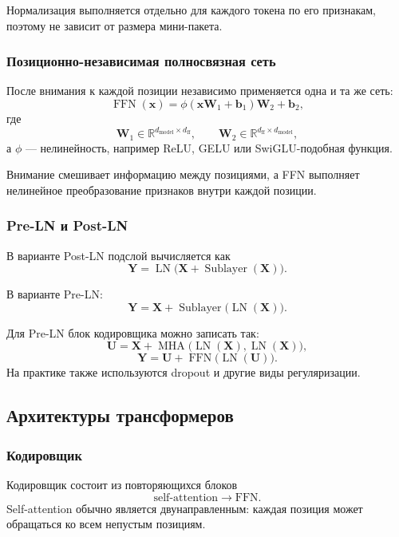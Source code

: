 \documentclass[12pt,a4paper]{article}
\theoremstyle{definition}
\newcommand{\R}{\mathbb{R}}
\newcommand{\1}{\mathbf{1}}
\begin{document}
Нормализация выполняется отдельно для каждого токена по его признакам,
поэтому не зависит от размера мини-пакета.

\subsubsection{Позиционно-независимая полносвязная сеть}

После внимания к каждой позиции независимо применяется одна и та же
сеть:
\[
    \operatorname{FFN}(\bm{x})
    =
    \phi(\bm{x}\bm{W}_1+\bm{b}_1)\bm{W}_2+\bm{b}_2,
\]
где
\[
    \bm{W}_1\in\R^{d_{\text{model}}\times d_{\text{ff}}},
    \qquad
    \bm{W}_2\in\R^{d_{\text{ff}}\times d_{\text{model}}},
\]
а $\phi$ --- нелинейность, например ReLU, GELU или SwiGLU-подобная
функция.

Внимание смешивает информацию между позициями, а FFN выполняет
нелинейное преобразование признаков внутри каждой позиции.

\subsubsection{Pre-LN и Post-LN}

В варианте Post-LN подслой вычисляется как
\[
    \bm{Y}
    =
    \operatorname{LN}
    \bigl(
        \bm{X}+\operatorname{Sublayer}(\bm{X})
    \bigr).
\]

В варианте Pre-LN:
\[
    \bm{Y}
    =
    \bm{X}
    +
    \operatorname{Sublayer}
    \bigl(
        \operatorname{LN}(\bm{X})
    \bigr).
\]

Для Pre-LN блок кодировщика можно записать так:
\[
    \bm{U}
    =
    \bm{X}
    +
    \operatorname{MHA}
    \bigl(
        \operatorname{LN}(\bm{X}),
        \operatorname{LN}(\bm{X})
    \bigr),
\]
\[
    \bm{Y}
    =
    \bm{U}
    +
    \operatorname{FFN}
    \bigl(
        \operatorname{LN}(\bm{U})
    \bigr).
\]
На практике также используются dropout и другие виды регуляризации.

\subsection{Архитектуры трансформеров}

\subsubsection{Кодировщик}

Кодировщик состоит из повторяющихся блоков
\[
    \text{self-attention}
    \longrightarrow
    \text{FFN}.
\]
Self-attention обычно является двунаправленным: каждая позиция может
обращаться ко всем непустым позициям.
\end{document}
